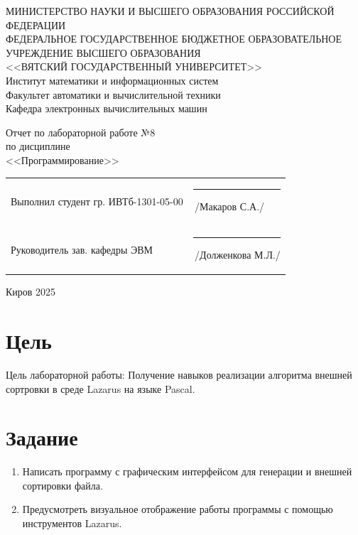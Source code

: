 \documentclass[a4paper,14pt]{extarticle}
\begin{document}
  \newpage\thispagestyle{empty}
  \begin{center}
    \MakeUppercase{
      Министерство науки и высшего образования Российской Федерации\\
      Федеральное государственное бюджетное образовательное учреждение высшего образования\\
      <<Вятский Государственный Университет>>\\
    }
    Институт математики и информационных систем\\
    Факультет автоматики и вычислительной техники\\
    Кафедра электронных вычислительных машин
  \end{center}
  \vfill

  \begin{center}
    Отчет по лабораторной работе №8\\
    по дисциплине\\
    <<Программирование>>\\
  \end{center}
  \vfill

  \noindent
  \begin{tabular}{ll}
    Выполнил студент гр. ИВТб-1301-05-00 \hspace{5mm} &
    \rule[-1mm]{25mm}{0.10mm}\,/Макаров С.А./\\
    
    Руководитель зав. кафедры ЭВМ & \rule[-1mm]{25mm}{0.10mm}\,/Долженкова М.Л./\\
  \end{tabular}

  \vfill
  \begin{center}
    Киров 2025
  \end{center}

  \newpage
  \section*{Цель}
  Цель лабораторной работы: Получение навыков реализации алгоритма внешней сортровки в среде Lazarus на языке Pascal.

  \section*{Задание}
  \begin{enumerate}
    \item Написать программу с графическим интерфейсом для генерации и внешней сортировки файла.
    \item Предусмотреть визуальное отображение работы программы с помощью инструментов Lazarus.
  \end{enumerate}
\end{document}
